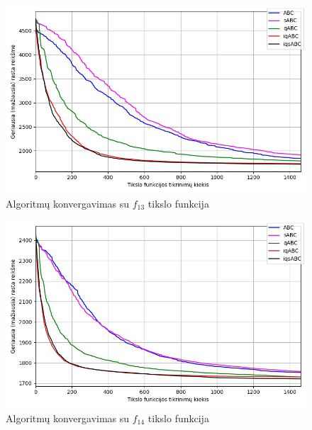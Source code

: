 \documentclass{VUMIFKompMagistrinis}
\begin{document}
\begin{landscape}
\begin{multicols}{2}
\begin{figure}[H]
    \centering
    \includegraphics[scale=0.45]{img/2kv/all_f13.jpg}
    \caption{Algoritmų konvergavimas su $f_{13}$ tikslo funkcija}
    \label{img:konf13}
\end{figure}

\begin{figure}[H]
    \centering
    \includegraphics[scale=0.45]{img/2kv/all_f14.jpg}
    \caption{Algoritmų konvergavimas su $f_{14}$ tikslo funkcija}
    \label{img:konf14}
\end{figure}


\end{multicols}


\end{landscape}
\end{document}
